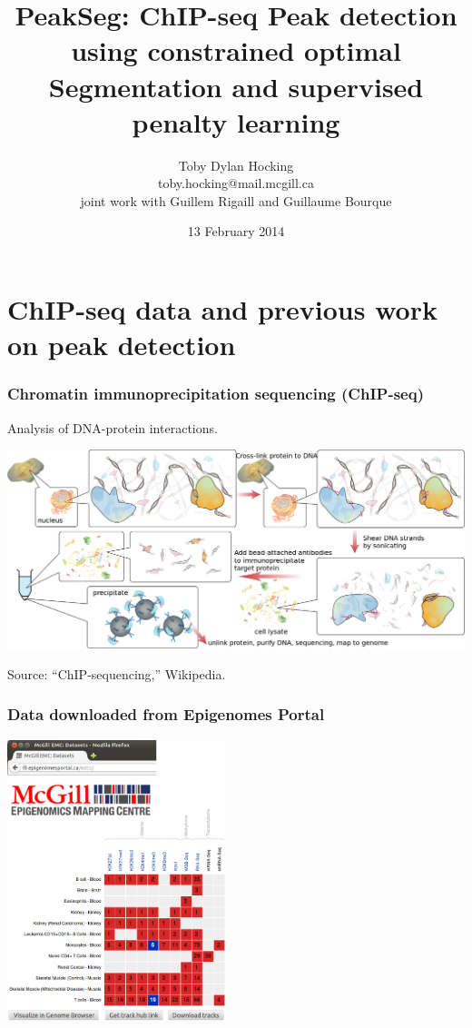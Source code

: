 \documentclass{beamer}
\begin{document}
\title{PeakSeg: ChIP-seq \textbf{Peak} detection using constrained
  optimal \textbf{Seg}mentation
and supervised penalty learning}  

\author{
  Toby Dylan Hocking\\
  toby.hocking@mail.mcgill.ca\\
  joint work with Guillem Rigaill and Guillaume Bourque}

\date{13 February 2014}

\maketitle

\section{ChIP-seq data and previous work on peak detection}


\begin{frame}
  \frametitle{Chromatin immunoprecipitation sequencing (ChIP-seq)}
  Analysis of DNA-protein interactions.

  \includegraphics[width=\textwidth]{Chromatin_immunoprecipitation_sequencing_wide.png}

  Source: ``ChIP-sequencing,'' Wikipedia.
\end{frame}

\begin{frame}
  \frametitle{Data downloaded from Epigenomes Portal}
  \includegraphics[width=2.5in]{screenshot-samples}
\end{frame}
\end{document}
